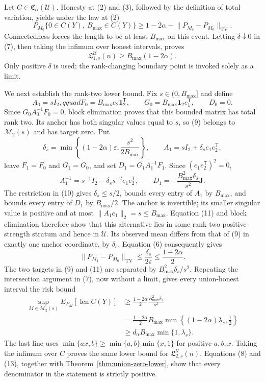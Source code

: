 Let \(C\in\mathfrak C_\alpha(\mathcal U)\).  Honesty at (2) and (3), followed by the definition of total variation, yields under the law at (2)
\[
 P_{M_0}\{0\in C(Y),\ B_{\max}\in C(Y)\}
 \geq1-2\alpha-\lVert P_{M_\delta}-P_{M_0}\rVert_{\mathrm{TV}}.
\tag{7}
\]
Connectedness forces the length to be at least \(B_{\max}\) on this event.  Letting \(\delta\downarrow0\) in (7), then taking the infimum over honest intervals, proves
\[
 \mathfrak L_{1,s}^{\mathcal U}(n)\geq B_{\max}(1-2\alpha).
\tag{8}
\]
Only positive \(\delta\) is used; the rank-changing boundary point is invoked solely as a limit.

We next establish the rank-two lower bound.  Fix \(s\in(0,B_{\max}]\) and define
\[
 A_0=sI_2,qquad
 F_0=B_{\max}e_2\mathbf1_2^{\mathsf T},\qquad
 G_0=B_{\max}\mathbf1_2e_1^{\mathsf T},\qquad
 D_0=0.
\tag{9}
\]
Since \(G_0A_0^{-1}F_0=0\), block elimination proves that this bounded matrix has total rank two.  Its anchor has both singular values equal to \(s\), so (9) belongs to \(\mathcal M_2(s)\) and has target zero.  Put
\[
 \delta_s=\min\left\{(1-2\alpha)\varepsilon,
 \frac{s^2}{2B_{\max}}\right\},
 \qquad
 A_1=sI_2+\delta_s e_1e_2^{\mathsf T},
\tag{10}
\]
leave \(F_1=F_0\) and \(G_1=G_0\), and set \(D_1=G_1A_1^{-1}F_1\).  Since \((e_1e_2^{\mathsf T})^2=0\),
\[
 A_1^{-1}=s^{-1}I_2-\delta_ss^{-2}e_1e_2^{\mathsf T},
 \qquad
 D_1=-\frac{B_{\max}^2\delta_s}{s^2}\mathbf J.
\tag{11}
\]
The restriction in (10) gives \(\delta_s\leq s/2\), bounds every entry of \(A_1\) by \(B_{\max}\), and bounds every entry of \(D_1\) by \(B_{\max}/2\).  The anchor is invertible; its smaller singular value is positive and at most \(\lVert A_1e_1\rVert_2=s\leq B_{\max}\).  Equation (11) and block elimination therefore show that this alternative lies in some rank-two positive-strength stratum and hence in \(\mathcal U\).  Its observed mean differs from that of (9) in exactly one anchor coordinate, by \(\delta_s\).  Equation (6) consequently gives
\[
 \lVert P_{M_1}-P_{M_0}\rVert_{\mathrm{TV}}
 \leq\frac{\delta_s}{2\varepsilon}
 \leq\frac{1-2\alpha}{2}.
\tag{12}
\]
The two targets in (9) and (11) are separated by \(B_{\max}^2\delta_s/s^2\).  Repeating the intersection argument in (7), now without a limit, gives every union-honest interval the risk bound
\[
 \begin{split}
 \sup_{M\in\mathcal M_2(s)}E_{P_M}[\operatorname{len}C(Y)]
 &\geq\frac{1-2\alpha}{2}\frac{B_{\max}^2\delta_s}{s^2}\\
 &=\frac{1-2\alpha}{2}B_{\max}
 \min\left\{(1-2\alpha)\lambda_s,\frac12\right\}\\
 &\geq d_\alpha B_{\max}\min\{1,\lambda_s\}.
 \end{split}
\tag{13}
\]
The last line uses \(\min\{ax,b\}\geq\min\{a,b\}\min\{x,1\}\) for positive \(a,b,x\).  Taking the infimum over \(C\) proves the same lower bound for \(\mathfrak L_{2,s}^{\mathcal U}(n)\).  Equations (8) and (13), together with Theorem~\ref{thm:union-zero-lower}, show that every denominator in the statement is strictly positive.

